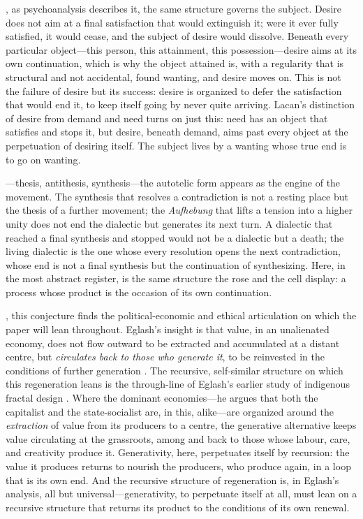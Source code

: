 , as psychoanalysis describes it, the same structure governs the subject. Desire does not aim at a final satisfaction that would extinguish it; were it ever fully satisfied, it would cease, and the subject of desire would dissolve. Beneath every particular object---this person, this attainment, this possession---desire aims at its own continuation, which is why the object attained is, with a regularity that is structural and not accidental, found wanting, and desire moves on. This is not the failure of desire but its success: desire is organized to defer the satisfaction that would end it, to keep itself going by never quite arriving. Lacan's distinction of desire from demand and need turns on just this: need has an object that satisfies and stops it, but desire, beneath demand, aims past every object at the perpetuation of desiring itself. The subject lives by a wanting whose true end is to go on wanting.

---thesis, antithesis, synthesis---the autotelic form appears as the engine of the movement. The synthesis that resolves a contradiction is not a resting place but the thesis of a further movement; the \emph{Aufhebung} that lifts a tension into a higher unity does not end the dialectic but generates its next turn. A dialectic that reached a final synthesis and stopped would not be a dialectic but a death; the living dialectic is the one whose every resolution opens the next contradiction, whose end is not a final synthesis but the continuation of synthesizing. Here, in the most abstract register, is the same structure the rose and the cell display: a process whose product is the occasion of its own continuation.

, this conjecture finds the political-economic and ethical articulation on which the paper will lean throughout. Eglash's insight is that value, in an unalienated economy, does not flow outward to be extracted and accumulated at a distant centre, but \emph{circulates back to those who generate it}, to be reinvested in the conditions of further generation \parencite{eglash2016}. The recursive, self-similar structure on which this regeneration leans is the through-line of Eglash's earlier study of indigenous fractal design \parencite{eglash1999}. Where the dominant economies---he argues that both the capitalist and the state-socialist are, in this, alike---are organized around the \emph{extraction} of value from its producers to a centre, the generative alternative keeps value circulating at the grassroots, among and back to those whose labour, care, and creativity produce it. Generativity, here, perpetuates itself by recursion: the value it produces returns to nourish the producers, who produce again, in a loop that is its own end.  And the recursive structure of regeneration is, in Eglash's analysis, all but universal---generativity, to perpetuate itself at all, must lean on a recursive structure that returns its product to the conditions of its own renewal.

